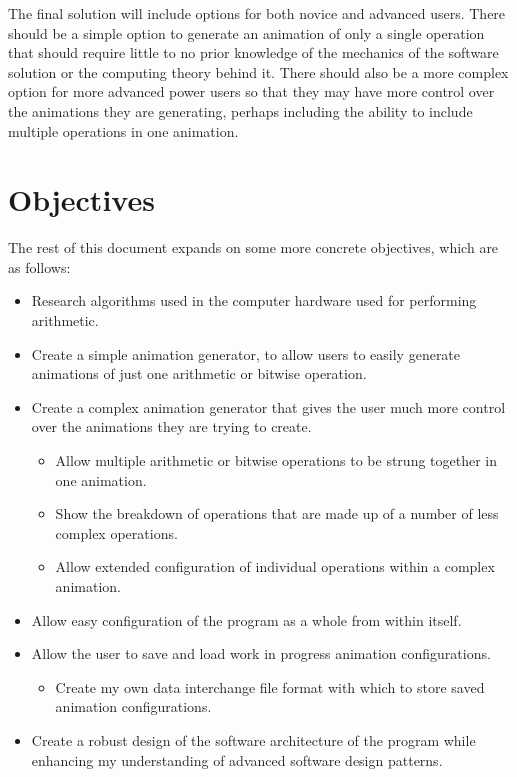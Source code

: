 \documentclass{report}
\begin{document}
The final solution will include options for both novice and advanced users.
There should be a simple option to generate an animation of only a single
operation that should require little to no prior knowledge of the mechanics of
the software solution or the computing theory behind it. There should also be a
more complex option for more advanced power users so that they may have more
control over the animations they are generating, perhaps including the ability
to include multiple operations in one animation.

\section*{Objectives}
The rest of this document expands on some more concrete objectives, which are
as follows:

\begin{itemize}
	\item Research algorithms used in the computer hardware used for performing
	arithmetic.
	\item Create a simple animation generator, to allow users to easily
	generate animations of just one arithmetic or bitwise operation.
	\item Create a complex animation generator that gives the user much more
	control over the animations they are trying to create.
	\begin{itemize}
		\item Allow multiple arithmetic or bitwise operations to be strung
		together in one animation.
		\item Show the breakdown of operations that are made up of a number of
		less complex operations.
		\item Allow extended configuration of individual operations within a
		complex animation.
	\end{itemize}
	\item Allow easy configuration of the program as a whole from within
	itself.
	\item Allow the user to save and load work in progress animation
	configurations.
	\begin{itemize}
		\item Create my own data interchange file format with which to store
		saved animation configurations.
	\end{itemize}
	\item Create a robust design of the software architecture of the program
	while enhancing my understanding of advanced software design patterns.
\end{itemize}
\end{document}
